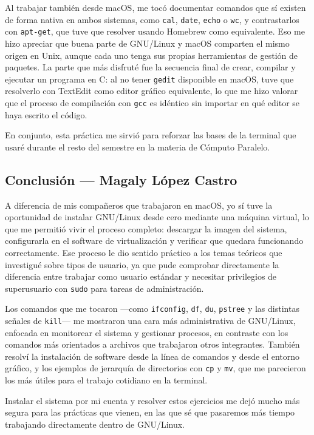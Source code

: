 Al trabajar también desde macOS, me tocó documentar comandos que sí existen de forma nativa en ambos sistemas, como \texttt{cal}, \texttt{date}, \texttt{echo} o \texttt{wc}, y contrastarlos con \texttt{apt-get}, que tuve que resolver usando Homebrew como equivalente. Eso me hizo apreciar que buena parte de GNU/Linux y macOS comparten el mismo origen en Unix, aunque cada uno tenga sus propias herramientas de gestión de paquetes. La parte que más disfruté fue la secuencia final de crear, compilar y ejecutar un programa en C: al no tener \texttt{gedit} disponible en macOS, tuve que resolverlo con TextEdit como editor gráfico equivalente, lo que me hizo valorar que el proceso de compilación con \texttt{gcc} es idéntico sin importar en qué editor se haya escrito el código.

En conjunto, esta práctica me sirvió para reforzar las bases de la terminal que usaré durante el resto del semestre en la materia de Cómputo Paralelo.

\subsection{Conclusión — Magaly López Castro}
\label{sec:prac01:concl:magaly}

A diferencia de mis compañeros que trabajaron en macOS, yo sí tuve la oportunidad de instalar GNU/Linux desde cero mediante una máquina virtual, lo que me permitió vivir el proceso completo: descargar la imagen del sistema, configurarla en el software de virtualización y verificar que quedara funcionando correctamente. Ese proceso le dio sentido práctico a los temas teóricos que investigué sobre tipos de usuario, ya que pude comprobar directamente la diferencia entre trabajar como usuario estándar y necesitar privilegios de superusuario con \texttt{sudo} para tareas de administración.

Los comandos que me tocaron —como \texttt{ifconfig}, \texttt{df}, \texttt{du}, \texttt{pstree} y las distintas señales de \texttt{kill}— me mostraron una cara más administrativa de GNU/Linux, enfocada en monitorear el sistema y gestionar procesos, en contraste con los comandos más orientados a archivos que trabajaron otros integrantes. También resolví la instalación de software desde la línea de comandos y desde el entorno gráfico, y los ejemplos de jerarquía de directorios con \texttt{cp} y \texttt{mv}, que me parecieron los más útiles para el trabajo cotidiano en la terminal.

Instalar el sistema por mi cuenta y resolver estos ejercicios me dejó mucho más segura para las prácticas que vienen, en las que sé que pasaremos más tiempo trabajando directamente dentro de GNU/Linux.

